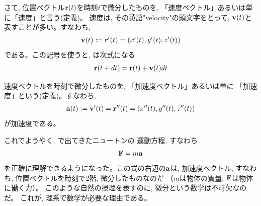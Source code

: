 さて, 位置ベクトル${\bf r}(t)$を時刻$t$で微分したものを, 
「速度ベクトル」あるいは単に「速度」と言う(定義)。
速度は, その英語"velocity"の頭文字をとって, ${\bf v}(t)$と表すことが多い。すなわち, 
\begin{eqnarray}
{\bf v}(t):={\bf r}'(t)=(x'(t), y'(t), z'(t))
\end{eqnarray}
である。この記号を使うと, は次式になる:
\begin{eqnarray}
{\bf r}(t+dt)={\bf r}(t)+{\bf v}(t) dt
\end{eqnarray}

速度ベクトルを時刻で微分したものを, 「加速度ベクトル」あるいは単に
「加速度」という(定義)。すなわち, 
\begin{eqnarray}
{\bf a}(t):={\bf v}'(t)={\bf r}''(t)=(x''(t), y''(t), z''(t))\nonumber\\
\end{eqnarray}
が加速度である。
\hv

これでようやく, で出てきたニュートンの
運動方程, すなわち
\begin{eqnarray}{\bf F}=m{\bf a}\end{eqnarray}
を正確に理解できるようになった。この式の右辺の${\bf a}$は, 加速度ベクトル, 
すなわち, 位置ベクトルを時刻で2階, 微分したものなのだ
（$m$は物体の質量, ${\bf F}$は物体に働く力）。
このような自然の摂理を表すのに, 微分という数学は不可欠なのだ。
これが, 理系で数学が必要な理由である。

